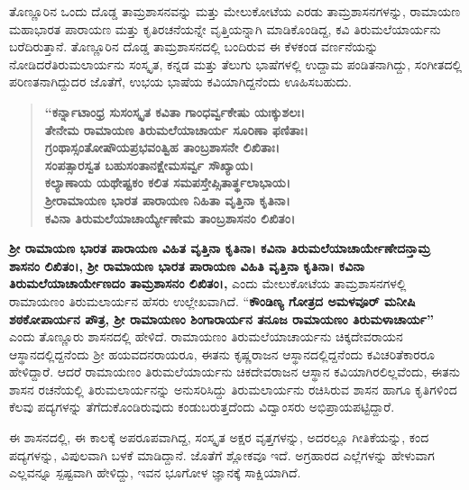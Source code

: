 ತೊಣ್ಣೂರಿನ ಒಂದು ದೊಡ್ಡ ತಾಮ್ರಶಾಸನವನ್ನು ಮತ್ತು ಮೇಲುಕೋಟೆಯ ಎರಡು ತಾಮ್ರಶಾಸನಗಳನ್ನು, ರಾಮಾಯಣ ಮಹಾಭಾರತ ಪಾರಾಯಣ ಮತ್ತು ಕೃತಿರಚನೆಯನ್ನೇ ವೃತ್ತಿಯನ್ನಾಗಿ ಮಾಡಿಕೊಂಡಿದ್ದ, ಕವಿ ತಿರುಮಲೆಯಾರ್ಯನು ಬರೆದಿರುತ್ತಾನೆ. ತೊಣ್ಣೂರಿನ ದೊಡ್ಡ ತಾಮ್ರಶಾಸನದಲ್ಲಿ ಬಂದಿರುವ ಈ ಕೆಳಕಂಡ ವರ್ಣನೆಯನ್ನು ನೋಡಿದರೆ\break ತಿರುಮಲಾರ್ಯನು ಸಂಸ್ಕೃತ, ಕನ್ನಡ ಮತ್ತು ತೆಲುಗು ಭಾಷೆಗಳಲ್ಲಿ ಉದ್ದಾಮ ಪಂಡಿತನಾಗಿದ್ದು, ಸಂಗೀತದಲ್ಲಿ ಪರಿಣತ\-ನಾಗಿದ್ದುದರ ಜೊತೆಗೆ, ಉಭಯ ಭಾಷೆಯ ಕವಿಯಾಗಿದ್ದನೆಂದು ಊಹಿಸಬಹುದು.

\begin{verse}
\textbf{“ಕರ್ನ್ನಾಟಾಂಧ್ರ ಸುಸಂಸ್ಕೃತ ಕವಿತಾ ಗಾಂಧರ್ವ್ವಕೇಷು ಯಃಕ್ಕುಶಲಃ। } \\\textbf{ತೇನೇಮ ರಾಮಾಯಣ ತಿರುಮಲೆಯಾಚಾರ್ಯ ಸೂರಿಣಾ ಫಣಿತಾಃ।} \\\textbf{ಗ್ರಂಥಾಸ್ಸಂತೋಷೌಯಪ್ರಭವಂತ್ವಿಹ ತಾಂಬ್ರಶಾಸನೇ ಲಿಖಿತಾಃ।} \\\textbf{ಸಂಪತ್ಸಾರಸ್ವತ ಬಹುಸಂತಾನಕ್ಷೇಮಸರ್ವ್ವ ಸೌಖ್ಯಾಯ।} \\\textbf{ಕಲ್ಯಾಣಾಯ ಯಥೇಷ್ಟಕಂ ಕಲಿತ ಸಮಪಸ್ತೇಪ್ಸಿತಾರ್ತ್ಥಲಾಭಾಯ।} \\\textbf{ಶ‍್ರೀರಾಮಾಯಣ ಭಾರತ ಪಾರಾಯಣ ನಿಹಿತಾ ವೃತ್ತಿನಾ ಕೃತಿನಾ।} \\\textbf{ಕವಿನಾ ತಿರುಮಲೆಯಾಚಾರ್ಯ್ಯೇಣೇಮ ತಾಂಬ್ರಶಾಸನಂ ಲಿಖಿತಂ।}
\end{verse}

\textbf{ಶ‍್ರೀ ರಾಮಾಯಣ ಭಾರತ ಪಾರಾಯಣ ವಿಹಿತ ವೃತ್ತಿನಾ ಕೃತಿನಾ। ಕವಿನಾ ತಿರುಮಲೆಯಾಚಾರ್ಯೇಣೇದನ್ತಾಮ್ರ ಶಾಸನಂ ಲಿಖಿತಂ।,}\textbf{ ಶ‍್ರೀ ರಾಮಾಯಣ ಭಾರತ ಪಾರಾಯಣ ವಿಹಿತಿ ವೃತ್ತಿನಾ ಕೃತಿನಾ। ಕವಿನಾ ತಿರುಮಲೆಯಾಚಾರ್ಯೇಣದಂ ತಾಮ್ರಶಾಸನಂ ಲಿಖಿತಂ।,} ಎಂದು ಮೇಲುಕೋಟೆಯ ತಾಮ್ರಶಾಸನಗಳಲ್ಲಿ ರಾಮಾಯಣಂ ತಿರುಮಲಾರ್ಯನ ಹೆಸರು ಉಲ್ಲೇಖವಾಗಿದೆ. “\textbf{ಕೌಂಡಿಣ್ಯ ಗೋತ್ರದ ಅಮಳವೂರ್​ ಮನೀಷಿ ಶಠಕೋಪಾರ್ಯನ ಪೌತ್ರ, ಶ‍್ರೀ ರಾಮಾಯಣಂ ಶಿಂಗಾರಾರ್ಯನ ತನೂಜ ರಾಮಾಯಣಂ ತಿರುಮಳಾಚಾರ್ಯ”} ಎಂದು ತೊಣ್ಣೂರು ಶಾಸನದಲ್ಲಿ ಹೇಳಿದೆ. ರಾಮಾಯಣಂ ತಿರುಮಲೆಯಾಚಾರ್ಯನು ಚಿಕ್ಕದೇವರಾಯನ ಆಸ್ಥಾನದಲ್ಲಿದ್ದನೆಂದು ಶ‍್ರೀ ಹಯವದನರಾಯರೂ, ಈತನು ಕೃಷ್ಣರಾಜನ ಆಸ್ಥಾನದಲ್ಲಿದ್ದನೆಂದು ಕವಿಚರಿತೆಕಾರರೂ ಹೇಳಿದ್ದಾರೆ. ಆದರೆ ರಾಮಾಯಣಂ ತಿರುಮಲೆಯಾರ್ಯನು ಚಿಕದೇವರಾಜನ ಆಸ್ಥಾನ ಕವಿಯಾಗಿರಲಿಲ್ಲವೆಂದು, ಈತನು ಶಾಸನ ರಚನೆಯಲ್ಲಿ ತಿರುಮಲಾರ್ಯನನ್ನು ಅನುಸರಿಸಿದ್ದು ತಿರುಮಲಾರ್ಯನು ರಚಿಸಿರುವ ಶಾಸನ ಹಾಗೂ ಕೃತಿಗಳಿಂದ ಕೆಲವು ಪದ್ಯಗಳನ್ನು ತೆಗೆದುಕೊಂಡಿರುವುದು ಕಂಡುಬರುತ್ತದೆಂದು ವಿದ್ವಾಂಸರು ಅಭಿಪ್ರಾಯಪಟ್ಟಿದ್ದಾರೆ.

ಈ ಶಾಸನದಲ್ಲಿ, ಈ ಕಾಲಕ್ಕೆ ಅಪರೂಪವಾಗಿದ್ದ, ಸಂಸ್ಕೃತ ಅಕ್ಷರ ವೃತ್ತಗಳನ್ನು, ಅದರಲ್ಲೂ ಗೀತಿಕೆಯನ್ನು, ಕಂದ ಪದ್ಯಗಳನ್ನು, ವಿಪುಲವಾಗಿ ಬಳಕೆ ಮಾಡಿದ್ದಾನೆ. ಜೊತೆಗೆ ಶ್ಲೋಕವೂ ಇದೆ. ಅಗ್ರಹಾರದ ಎಲ್ಲೆಗಳನ್ನು ಹೇಳುವಾಗ ಎಲ್ಲವನ್ನೂ ಸ್ಪಷ್ಟವಾಗಿ ಹೇಳಿದ್ದು, ಇವನ ಭೂಗೋಳ ಜ್ಞಾನಕ್ಕೆ ಸಾಕ್ಷಿಯಾಗಿದೆ.

